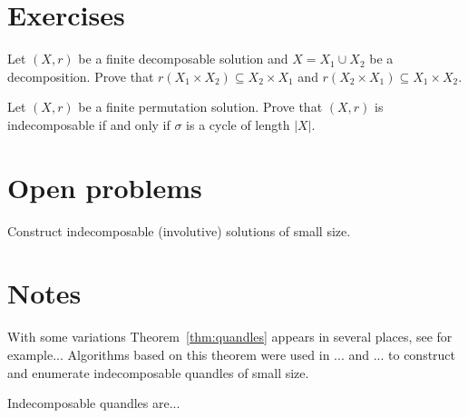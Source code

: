 \section*{Exercises}

\begin{prob}
\label{prob:decomposition}
Let $(X,r)$ be a finite decomposable solution and $X=X_1\cup X_2$ be a decomposition. Prove that
$r(X_1\times X_2)\subseteq X_2\times X_1$ and 
$r(X_2\times X_1)\subseteq X_1\times X_2$. 
\end{prob}

\begin{prob}
Let $(X,r)$ be a finite  permutation solution. 
Prove that $(X,r)$ is indecomposable if and only if $\sigma$ is a cycle of length $|X|$.
\end{prob}


\section*{Open problems}

\begin{problem}
Construct indecomposable (involutive) solutions of small size. 
\end{problem}

\section*{Notes}

With some variations Theorem~\ref{thm:quandles} appears in several places, 
see for example... Algorithms based on this theorem
were used in ... and ... to construct and enumerate indecomposable 
quandles of small size. 

Indecomposable quandles are...

